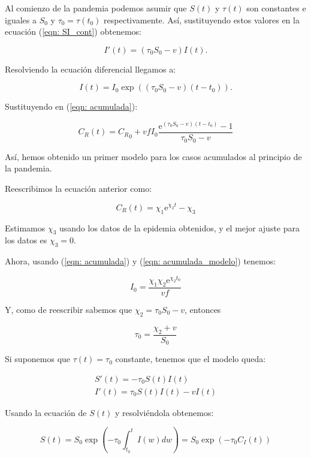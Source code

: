 Al comienzo de la pandemia podemos asumir que $S(t)$ y $\tau (t)$ son constantes e iguales a $S_0$ y $\tau_0 = \tau (t_0)$ respectivamente. Así, sustituyendo estos valores en la ecuación (\ref{eqn: SI_cont}) obtenemos:

$$I'(t) = (\tau_0 S_0 -v) I(t).$$

Resolviendo la ecuación diferencial llegamos a:

$$I(t) = I_0\exp{((\tau_0 S_0-v)(t-t_0))}.$$

Sustituyendo en (\ref{eqn: acumulada}):

$$C_R(t) = {C_R}_0 + vfI_0\frac{\mathrm{e}^{(\tau_0 S_0 -v)(t-t_0)} -1}{\tau_0 S_0-v}$$

Así, hemos obtenido un primer modelo para los casos acumulados al principio de la pandemia.

Reescribimos la ecuación anterior como:

\begin{equation}
\label{eqn: acumulada_modelo}
C_R(t) = \chi_1 \mathrm{e}^{\chi_2 t} -\chi_3
\end{equation}

Estimamos $\chi_3$ usando los datos de la epidemia obtenidos, y el mejor ajuste para los datos es $\chi_3=0$.

Ahora, usando (\ref{eqn: acumulada}) y (\ref{eqn: acumulada_modelo}) tenemos:

\begin{equation}
I_0=\frac{\chi_1\chi_2\mathrm{e}^{\chi_2 t_0}}{vf}
\end{equation}

Y, como de reescribir sabemos que $\chi_2 = \tau_0 S_0-v$, entonces

\begin{equation}
\tau_0 = \frac{\chi_2+v}{S_0}
\end{equation}

Si suponemos que $\tau (t) = \tau_0$ constante, tenemos que el modelo queda:

\begin{equation}
\begin{aligned}
S'(t) = -\tau_0S(t)I(t) \\
I'(t) = \tau_0S(t)I(t) -vI(t)
\end{aligned}
\end{equation}

Usando la ecuación de $S(t)$ y resolviéndola obtenemos:

$$S(t) = S_0\exp{\left( -\tau_0 \int_{t_0}^t I(w) dw \right)} = S_0\exp{(-\tau_0 C_I(t))}$$

